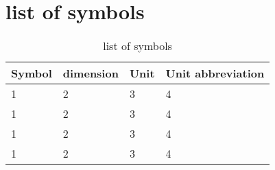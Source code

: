 \section*{list of symbols} \label{section: symbols}

\begin{table}[ht]
\centering
\caption{list of symbols}
\begin{tabular}[t]
{m{}m{}m{}m{}}
\toprule
\textbf{Symbol}&\textbf{dimension}&\textbf{Unit}&\textbf{Unit abbreviation}\\
\midrule
1&2&3&4\\
1&2&3&4\\
1&2&3&4\\
1&2&3&4\\
\bottomrule
\end{tabular}
\end{table}